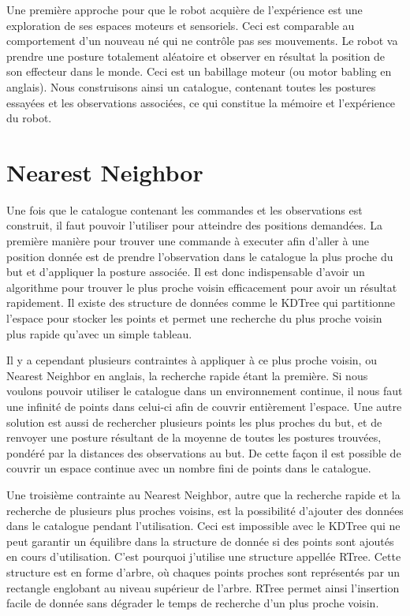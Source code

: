 \documentclass[11pt,french]{report}
\begin{document}
Une première approche pour que le robot acquière de l'expérience est une exploration de ses espaces moteurs et sensoriels. Ceci est comparable au comportement d'un nouveau né qui ne contrôle pas ses mouvements. Le robot va prendre une posture totalement aléatoire et observer en résultat la position de son effecteur dans le monde. Ceci est un babillage moteur (ou motor babling en anglais). Nous construisons ainsi un catalogue, contenant toutes les postures essayées et les observations associées, ce qui constitue la mémoire et l'expérience du robot.


\section{Nearest Neighbor}

Une fois que le catalogue contenant les commandes et les observations est construit, il faut pouvoir l'utiliser pour atteindre des positions demandées. La première manière pour trouver une commande à executer afin d'aller à une position donnée est de prendre l'observation dans le catalogue la plus proche du but et d'appliquer la posture associée. Il est donc indispensable d'avoir un algorithme pour trouver le plus proche voisin efficacement pour avoir un résultat rapidement. Il existe des structure de données comme le KDTree qui partitionne l'espace pour stocker les points et permet une recherche du plus proche voisin plus rapide qu'avec un simple tableau. 

Il y a cependant plusieurs contraintes à appliquer à ce plus proche voisin, ou Nearest Neighbor en anglais, la recherche rapide étant la première. Si nous voulons pouvoir utiliser le catalogue dans un environnement continue, il nous faut une infinité de points dans celui-ci afin de couvrir entièrement l'espace. Une autre solution est aussi de rechercher plusieurs points les plus proches du but, et de renvoyer une posture résultant de la moyenne de toutes les postures trouvées, pondéré par la distances des observations au but. De cette façon il est possible de couvrir un espace continue avec un nombre fini de points dans le catalogue.

Une troisième contrainte au Nearest Neighbor, autre que la recherche rapide et la recherche de plusieurs plus proches voisins, est la possibilité d'ajouter des données dans le catalogue pendant l'utilisation. Ceci est impossible avec le KDTree qui ne peut garantir un équilibre dans la structure de donnée si des points sont ajoutés en cours d'utilisation. C'est pourquoi j'utilise une structure appellée RTree. Cette structure est en forme d'arbre, où chaques points proches sont représentés par un rectangle englobant au niveau supérieur de l'arbre. RTree permet ainsi l'insertion facile de donnée sans dégrader le temps de recherche d'un plus proche voisin.
\end{document}
